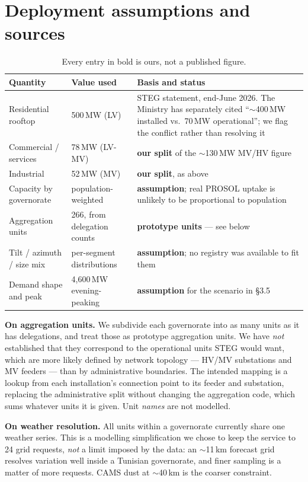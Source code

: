 \documentclass[11pt,a4paper]{article}
\newcommand{\unit}[1]{\,\textsf{\small #1}}
\begin{document}
\section{Deployment assumptions and sources}
\label{sec:assump}

\begin{table}[H]
\centering\small
\begin{tabular}{@{}llp{6.1cm}@{}}
\toprule
\textbf{Quantity} & \textbf{Value used} & \textbf{Basis and status} \\
\midrule
Residential rooftop & 500\unit{MW} (LV) & STEG statement, end-June 2026. The Ministry has separately cited ``$\sim$400\unit{MW} installed vs.\ 70\unit{MW} operational''; we flag the conflict rather than resolving it \\
Commercial / services & 78\unit{MW} (LV-MV) & \textbf{our split} of the $\sim$130\unit{MW} MV/HV figure \\
Industrial & 52\unit{MW} (MV) & \textbf{our split}, as above \\
Capacity by governorate & population-weighted & \textbf{assumption}; real PROSOL uptake is unlikely to be proportional to population \\
Aggregation units & 266, from delegation counts & \textbf{prototype units} --- see below \\
Tilt / azimuth / size mix & per-segment distributions & \textbf{assumption}; no registry was available to fit them \\
Demand shape and peak & 4{,}600\unit{MW} evening-peaking & \textbf{assumption} for the scenario in \S3.5 \\
\bottomrule
\end{tabular}
\caption{Every entry in bold is ours, not a published figure.}
\label{tab:seg}
\end{table}

\textbf{On aggregation units.} We subdivide each governorate into as many units
as it has delegations, and treat those as prototype aggregation units. We have
\emph{not} established that they correspond to the operational units STEG would
want, which are more likely defined by network topology --- HV/MV substations and
MV feeders --- than by administrative boundaries. The intended mapping is a
lookup from each installation's connection point to its feeder and substation,
replacing the administrative split without changing the aggregation code, which
sums whatever units it is given. Unit \emph{names} are not modelled.

\textbf{On weather resolution.} All units within a governorate currently share
one weather series. This is a modelling simplification we chose to keep the
service to 24 grid requests, \emph{not} a limit imposed by the data: an
$\sim$11\unit{km} forecast grid resolves variation well inside a Tunisian
governorate, and finer sampling is a matter of more requests. CAMS dust at
$\sim$40\unit{km} is the coarser constraint.
\end{document}
